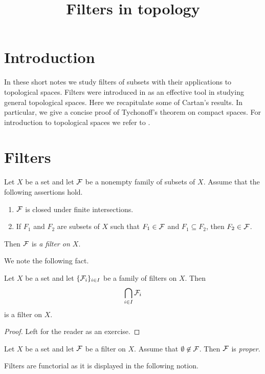 



\title{Filters in topology}
\date{}
\maketitle

\section{Introduction}
\noindent
In these short notes we study filters of subsets with their applications to topological spaces. Filters were introduced in \cite{cartan1937filters} as an effective tool in studying general topological spaces. Here we recapitulate some of Cartan's results. In particular, we give a concise proof of Tychonoff's theorem on compact spaces. For introduction to topological spaces we refer to \cite{topological_spaces_monygham}.

\section{Filters}

\begin{definition}
	Let $X$ be a set and let ${\mathcal F}$ be a nonempty family of subsets of $X$. Assume that the following assertions hold.
	\begin{enumerate}[label=\textbf{(\arabic*)}, leftmargin=*]
		\item ${\mathcal F}$ is closed under finite intersections.
		\item If $F_1$ and $F_2$ are subsets of $X$ such that $F_1 \in {\mathcal F}$ and $F_1\subseteq F_2$, then $F_2 \in {\mathcal F}$.
	\end{enumerate}
	Then ${\mathcal F}$ is \textit{a filter on $X$}.
\end{definition}
\noindent
We note the following fact.

\begin{fact}\label{fact:filters_are_closed_under_intersections}
	Let $X$ be a set and let $\{{\mathcal F}_i\}_{i\in I}$ be a family of filters on $X$. Then
	$$\bigcap_{i\in I}{\mathcal F}_i$$
	is a filter on $X$.
\end{fact}
\begin{proof}
	Left for the reader as an exercise.
\end{proof}

\begin{definition}
	Let $X$ be a set and let ${\mathcal F}$ be a filter on $X$. Assume that $\emptyset \not \in {\mathcal F}$. Then ${\mathcal F}$ is \textit{proper}.
\end{definition}
\noindent
Filters are functorial as it is displayed in the following notion.

